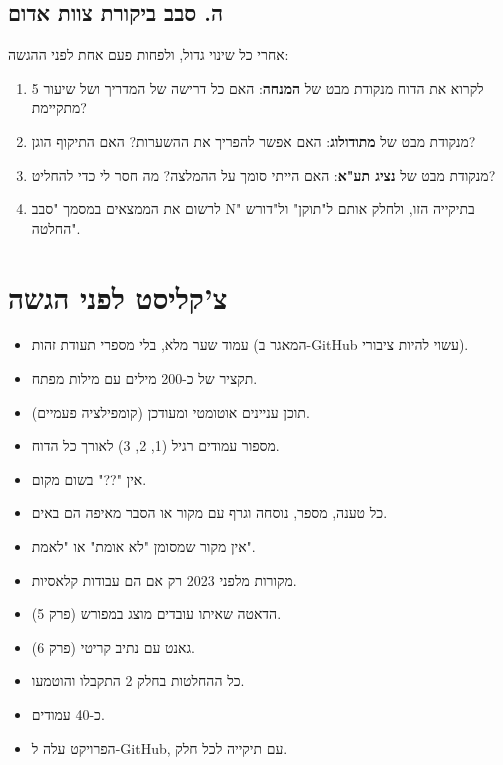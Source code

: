 \documentclass[11pt,a4paper]{article}
\newcommand{\en}[1]{\foreignlanguage{english}{#1}}
\newcommand{\cb}{\framebox[1.7ex]{\rule{0pt}{1.3ex}}}
\newenvironment{checks}{\begin{itemize}\renewcommand{\labelitemi}{\cb}}{\end{itemize}}
\begin{document}
\subsection*{ה. סבב ביקורת צוות אדום}
אחרי כל שינוי גדול, ולפחות פעם אחת לפני ההגשה:
\begin{enumerate}
\item לקרוא את הדוח מנקודת מבט של \textbf{המנחה}: האם כל דרישה של המדריך ושל שיעור 5 מתקיימת?
\item מנקודת מבט של \textbf{מתודולוג}: האם אפשר להפריך את ההשערות? האם התיקוף הוגן?
\item מנקודת מבט של \textbf{נציג תע"א}: האם הייתי סומך על ההמלצה? מה חסר לי כדי להחליט?
\item לרשום את הממצאים במסמך "סבב \en{N}" בתיקייה הזו, ולחלק אותם ל"תוקן" ול"דורש החלטה".
\end{enumerate}

\section{צ'קליסט לפני הגשה}
\begin{checks}
\item עמוד שער מלא, בלי מספרי תעודת זהות (המאגר ב-\en{GitHub} עשוי להיות ציבורי).
\item תקציר של כ-200 מילים עם מילות מפתח.
\item תוכן עניינים אוטומטי ומעודכן (קומפילציה פעמיים).
\item מספור עמודים רגיל (1, 2, 3) לאורך כל הדוח.
\item אין "??" בשום מקום.
\item כל טענה, מספר, נוסחה וגרף עם מקור או הסבר מאיפה הם באים.
\item אין מקור שמסומן "לא אומת" או "לאמת".
\item מקורות מלפני 2023 רק אם הם עבודות קלאסיות.
\item הדאטה שאיתו עובדים מוצג במפורש (פרק 5).
\item גאנט עם נתיב קריטי (פרק 6).
\item כל ההחלטות בחלק 2 התקבלו והוטמעו.
\item כ-40 עמודים.
\item הפרויקט עלה ל-\en{GitHub}, עם תיקייה לכל חלק.
\end{checks}
\end{document}
